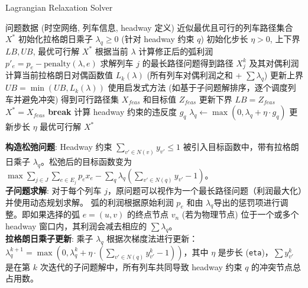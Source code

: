 \documentclass{article}
\begin{document}
    \begin{algorithm}[h]
        \caption{Lagrangian Relaxation Solver}
        \begin{algorithmic}[1]
            \Require 问题数据 (时空网络, 列车信息, headway 定义)
            \Ensure 近似最优且可行的列车路径集合 $X^*$
            \State 初始化拉格朗日乘子 $\lambda_q \ge 0$ (针对 headway 约束 $q$)
            \State 初始化步长 $\eta > 0$, 上下界 $LB, UB$, 最优可行解 $X^*$
                    \State 根据当前 $\lambda$ 计算修正后的弧利润 $p'_e = p_e -
                    \text{penalty}(\lambda, e)$
                    \State 求解列车 $j$ 的最长路径问题得到路径 $X^k_j$ 及其对偶利润
                \EndFor
                \State 计算当前拉格朗日对偶函数值 $L_k(\lambda)$ (所有列车对偶利润之和 + $\sum \lambda_q$)
                \State 更新上界 $UB = \min(UB, L_k(\lambda))$
                \State 使用启发式方法 (如基于子问题解排序，逐个调度列车并避免冲突) 得到可行路径集 $X_{feas}$
                和目标值 $Z_{feas}$
                    \State 更新下界 $LB = Z_{feas}$
                    \State $X^* = X_{feas}$
                \EndIf
                    \State \textbf{break}
                \EndIf
                \State 计算 headway 约束的违反度 $g_q$
                \State $\lambda_q \gets \max(0, \lambda_q + \eta \cdot g_q)$
                \State 更新步长 $\eta$
            \EndFor
            \State \Return 最优可行解 $X^*$
        \end{algorithmic}\label{alg:lagrangian_relaxation}
    \end{algorithm}

    \textbf{构造松弛问题}:
    Headway 约束 $\sum_{v' \in N(v)} y_{v'} \le 1$
    被引入目标函数中，带有拉格朗日乘子 $\lambda_q$。松弛后的目标函数变为 $\max
    \sum_{j \in J} \sum_{e \in E_j} p_e x_e - \sum_q \lambda_q
    (\sum_{v' \in N(q)} y_{v'} - 1)$。\\
    \textbf{子问题求解}:
    对于每个列车 $j$，原问题可以视作为一个最长路径问题（利润最大化）并使用动态规划求解。 弧的利润根据原始利润 $p_e$ 和由 $\lambda_q$导出的惩罚项进行调整。即如果选择的弧 $e=(u,v)$ 的终点节点 $v_n$ (若为物理节点)
    位于一个或多个 headway 窗口内，其利润会减去相应的 $\sum \lambda_q$。\\
    \textbf{拉格朗日乘子更新}:
    乘子 $\lambda_q$ 根据次梯度法进行更新： $\lambda_q^{k+1} =
    \max(0, \lambda_q^k + \eta \cdot (\sum_{v' \in N(q)}
    y_{v'}^{k} - 1))$，其中 $\eta$ 是步长 (\texttt{eta})，$\sum
    y_{v'}^{k}$ 是在第 $k$ 次迭代的子问题解中，所有列车共同导致 headway 约束 $q$
    的冲突节点总占用数。\\
\end{document}

